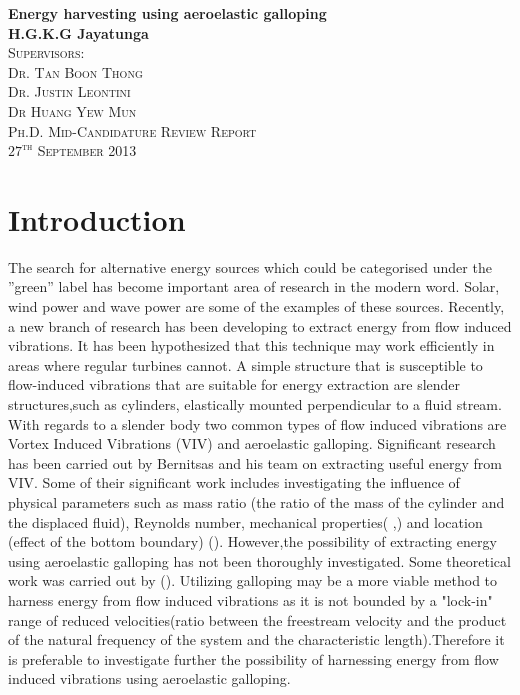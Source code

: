 \documentclass{article}
\begin{document}
\begin{titlepage}
\begin{center}
{\huge \bfseries Energy harvesting using aeroelastic galloping}\\[2.5cm]
{\LARGE \bfseries H.G.K.G Jayatunga}\\[2.5cm]
\textsc{\Large Supervisors:\\[0.5cm] Dr. Tan Boon Thong \\[0.4cm] Dr. Justin Leontini \\[0.5cm] Dr Huang Yew Mun}\\[6.5cm]
\textsc{\Large Ph.D. Mid-Candidature Review Report}\\

\vfill
\textsc{\Large $27^{\text{th}}$ September 2013}
\end{center}
\end{titlepage}
\tableofcontents

\section{Introduction}
The search for alternative energy sources which could be categorised under the ”green” label has become important area of research in the modern word. Solar, wind power and wave power are some of the examples of these sources. Recently, a new branch of research has been developing to extract energy from flow induced vibrations. It has been hypothesized that this technique may work efficiently in areas where regular turbines cannot. 
A simple structure that is susceptible to flow-induced vibrations that are suitable for energy extraction are slender structures,such as cylinders, elastically mounted perpendicular to a fluid stream. With regards to a slender body two common types of   flow induced vibrations are Vortex Induced Vibrations (VIV) and aeroelastic galloping. Significant research has been carried out by Bernitsas and his team on extracting useful energy from VIV. Some of their significant work includes investigating the influence  of physical parameters such as mass ratio (the ratio of the mass of the cylinder and the displaced fluid), Reynolds number, mechanical properties(\cite{Raghavan2010a} ,\cite{Lee2011b}) and location (effect of the bottom boundary) (\cite{Raghavan2009}). However,the possibility of extracting energy using aeroelastic galloping has not been thoroughly investigated. Some theoretical work was carried out by (\cite{Barrero-Gil2010a}). Utilizing galloping may be a more viable method to harness energy from flow induced vibrations as it is not bounded by a "lock-in" range of reduced velocities(ratio between the freestream velocity and the product of the natural frequency of the system and the characteristic length).Therefore it is preferable to investigate further the possibility of harnessing energy from flow induced vibrations using aeroelastic galloping. 
\end{document}
